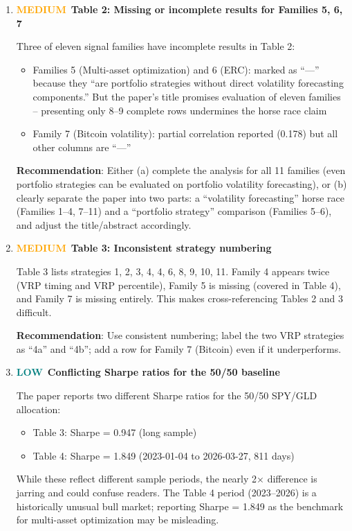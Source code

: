 \documentclass[12pt,a4paper]{article}
\newcommand{\MEDIUM}{\textcolor{orange}{\textbf{MEDIUM}}}
\newcommand{\LOW}{\textcolor{teal}{\textbf{LOW}}}
\begin{document}
\begin{enumerate}[label=D5.\arabic*]

\item \MEDIUM\ \textbf{Table 2: Missing or incomplete results for Families 5, 6, 7}

Three of eleven signal families have incomplete results in Table 2:
\begin{itemize}
    \item Families 5 (Multi-asset optimization) and 6 (ERC): marked as ``---'' because they ``are portfolio strategies without direct volatility forecasting components.'' But the paper's title promises evaluation of eleven families -- presenting only 8--9 complete rows undermines the horse race claim
    \item Family 7 (Bitcoin volatility): partial correlation reported (0.178) but all other columns are ``---''
\end{itemize}
\textbf{Recommendation}: Either (a) complete the analysis for all 11 families (even portfolio strategies can be evaluated on portfolio volatility forecasting), or (b) clearly separate the paper into two parts: a ``volatility forecasting'' horse race (Families 1--4, 7--11) and a ``portfolio strategy'' comparison (Families 5--6), and adjust the title/abstract accordingly.

\item \MEDIUM\ \textbf{Table 3: Inconsistent strategy numbering}

Table 3 lists strategies 1, 2, 3, 4, 4, 6, 8, 9, 10, 11. Family 4 appears twice (VRP timing and VRP percentile), Family 5 is missing (covered in Table 4), and Family 7 is missing entirely. This makes cross-referencing Tables 2 and 3 difficult.

\textbf{Recommendation}: Use consistent numbering; label the two VRP strategies as ``4a'' and ``4b''; add a row for Family 7 (Bitcoin) even if it underperforms.

\item \LOW\ \textbf{Conflicting Sharpe ratios for the 50/50 baseline}

The paper reports two different Sharpe ratios for the 50/50 SPY/GLD allocation:
\begin{itemize}
    \item Table 3: Sharpe = 0.947 (long sample)
    \item Table 4: Sharpe = 1.849 (2023-01-04 to 2026-03-27, 811 days)
\end{itemize}
While these reflect different sample periods, the nearly 2$\times$ difference is jarring and could confuse readers. The Table 4 period (2023--2026) is a historically unusual bull market; reporting Sharpe = 1.849 as the benchmark for multi-asset optimization may be misleading.


\end{enumerate}
\end{document}
